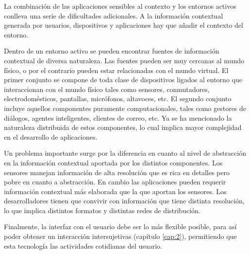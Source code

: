 {\begin{itemize}
\end{itemize}

La combinación de las aplicaciones sensibles al contexto y los entornos activos
conlleva una serie de dificultades adicionales. A la información contextual
generada por usuarios, dispositivos y aplicaciones hay que añadir el contexto
del entorno.

Dentro de un entorno activo se pueden encontrar fuentes de información
contextual de diversa naturaleza. Las fuentes pueden ser muy cercanas al mundo
físico, o por el contrario pueden estar relacionadas con el mundo virtual. El
primer conjunto se compone de toda clase de dispositivos ligados al entorno que
interaccionan con el mundo físico tales como sensores, conmutadores,
electrodomésticos, pantallas, micrófonos, altavoces, etc. El segundo conjunto
incluye aquellos componentes puramente computacionales, tales como gestores de
diálogos, agentes inteligentes, clientes de correo, etc. Ya se ha mencionado la
naturaleza distribuida de estos componentes, lo cual implica mayor complejidad
en el desarrollo de aplicaciones.


Un problema importante surge por la diferencia en cuanto al nivel de abstracción
en la información contextual aportada por los distintos componentes. Los
sensores manejan información de alta resolución que es rica en detalles pero
pobre en cuanto a abstracción. En cambio las aplicaciones pueden requerir
información contextual más elaborada que la que aportan los sensores. Los
desarrolladores tienen que convivir con información que tiene distinta
resolución, lo que implica distintos formatos y distintas redes de
distribución.


Finalmente, la interfaz con el usuario debe ser lo más flexible posible, para
así poder obtener un interacción intersujetivas (capítulo \ref{cap:2}),
permitiendo que esta tecnología las actividades cotidianas del usuario.


}
